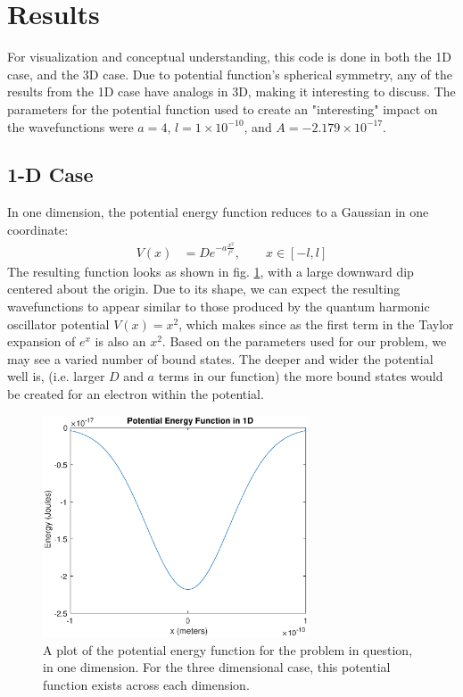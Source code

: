 \documentclass[12pt]{article}
\begin{document}
\section*{Results}
For visualization and conceptual understanding, this code is done in both the 1D case, and the 3D case.  Due to potential function's spherical symmetry, any of the results from the 1D case have analogs in 3D, making it interesting to discuss.  The parameters for the potential function used to create an "interesting" impact on the wavefunctions were $a = 4$, $l = 1\times 10^{-10}$, and $A = -2.179\times 10^{-17}$.
\subsection*{1-D Case}
In one dimension, the potential energy function reduces to a Gaussian in one coordinate:
\begin{align*}
V(x) &= De^{-a\frac{x^2}{l^2}},\quad\quad x\in [-l,l]
\end{align*}
The resulting function looks as shown in fig. \ref{potential}, with a large downward dip centered about the origin.  Due to its shape, we can expect the resulting wavefunctions to appear similar to those produced by the quantum harmonic oscillator potential $V(x) = x^2$, which makes since as the first term in the Taylor expansion of $e^x$ is also an $x^2$.  Based on the parameters used for our problem, we may see a varied number of bound states.  The deeper and wider the potential well is, (i.e. larger $D$ and $a$ terms in our function) the more bound states would be created for an electron within the potential. \cite{quantum}

\begin{figure}
\begin{center}
\includegraphics[width=0.7\textwidth]{./pics/potential.eps}
\end{center}
\caption{\label{potential} A plot of the potential energy function for the problem in question, in one dimension.  For the three dimensional case, this potential function exists across each dimension.}
\end{figure}
\end{document}
